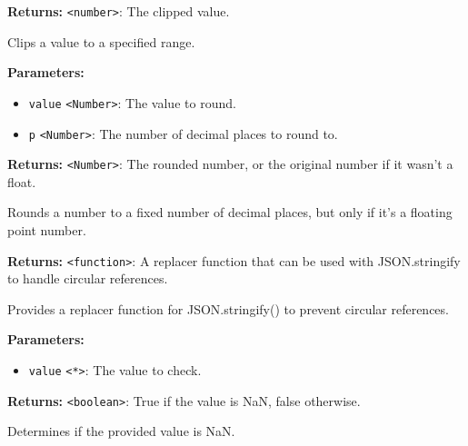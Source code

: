 \documentclass[12pt,a4paper]{article}
\begin{document}
\noindent \textbf{Returns:} \texttt{<number>}: The clipped value.

\noindent Clips a value to a specified range.

\vspace{5mm}
\noindent {}


\noindent \textbf{Parameters:}
\begin{itemize}
  \item \texttt{value} \texttt{<Number>}: The value to round.
  \item \texttt{p} \texttt{<Number>}: The number of decimal places to round to.
\end{itemize}

\noindent \textbf{Returns:} \texttt{<Number>}: The rounded number, or the original number if it wasn't a float.

\noindent Rounds a number to a fixed number of decimal places, but only if it's a floating point number.

\vspace{5mm}
\noindent {}


\noindent \textbf{Returns:} \texttt{<function>}: A replacer function that can be used with JSON.stringify to handle circular references.

\noindent Provides a replacer function for JSON.stringify() to prevent circular references.

\vspace{5mm}
\noindent {}


\noindent \textbf{Parameters:}
\begin{itemize}
  \item \texttt{value} \texttt{<*>}: The value to check.
\end{itemize}

\noindent \textbf{Returns:} \texttt{<boolean>}: True if the value is NaN, false otherwise.

\noindent Determines if the provided value is NaN.

\vspace{5mm}
\noindent {}
\end{document}
